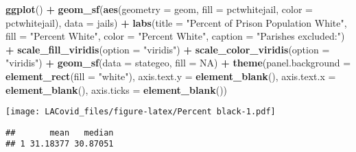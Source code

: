 \documentclass[
]{article}
\newenvironment{Shaded}{\begin{snugshade}}{\end{snugshade}}
\newcommand{\DataTypeTok}[1]{\textcolor[rgb]{0.13,0.29,0.53}{#1}}
\newcommand{\KeywordTok}[1]{\textcolor[rgb]{0.13,0.29,0.53}{\textbf{#1}}}
\newcommand{\NormalTok}[1]{#1}
\newcommand{\OperatorTok}[1]{\textcolor[rgb]{0.81,0.36,0.00}{\textbf{#1}}}
\newcommand{\OtherTok}[1]{\textcolor[rgb]{0.56,0.35,0.01}{#1}}
\newcommand{\StringTok}[1]{\textcolor[rgb]{0.31,0.60,0.02}{#1}}
\begin{document}
\begin{Shaded}
\begin{Highlighting}[]
\KeywordTok{ggplot}\NormalTok{() }\OperatorTok{+}
\StringTok{  }\KeywordTok{geom_sf}\NormalTok{(}\KeywordTok{aes}\NormalTok{(}\DataTypeTok{geometry =}\NormalTok{ geom, }\DataTypeTok{fill =}\NormalTok{ pctwhitejail, }\DataTypeTok{color =}\NormalTok{ pctwhitejail), }\DataTypeTok{data =}\NormalTok{ jails) }\OperatorTok{+}
\StringTok{  }\KeywordTok{labs}\NormalTok{(}\DataTypeTok{title =} \StringTok{"Percent of Prison Population White"}\NormalTok{,}
       \DataTypeTok{fill =} \StringTok{"Percent White"}\NormalTok{,}
       \DataTypeTok{color =} \StringTok{"Percent White"}\NormalTok{,}
       \DataTypeTok{caption =} \StringTok{"Parishes excluded:"}\NormalTok{) }\OperatorTok{+}\StringTok{ }
\StringTok{  }\KeywordTok{scale_fill_viridis}\NormalTok{(}\DataTypeTok{option =} \StringTok{"viridis"}\NormalTok{) }\OperatorTok{+}\StringTok{ }
\StringTok{  }\KeywordTok{scale_color_viridis}\NormalTok{(}\DataTypeTok{option =} \StringTok{"viridis"}\NormalTok{) }\OperatorTok{+}
\StringTok{  }\KeywordTok{geom_sf}\NormalTok{(}\DataTypeTok{data =}\NormalTok{ stategeo, }\DataTypeTok{fill =} \OtherTok{NA}\NormalTok{) }\OperatorTok{+}
\StringTok{  }\KeywordTok{theme}\NormalTok{(}\DataTypeTok{panel.background =} \KeywordTok{element_rect}\NormalTok{(}\DataTypeTok{fill =} \StringTok{"white"}\NormalTok{),}
        \DataTypeTok{axis.text.y =} \KeywordTok{element_blank}\NormalTok{(),}
        \DataTypeTok{axis.text.x =} \KeywordTok{element_blank}\NormalTok{(),}
        \DataTypeTok{axis.ticks =} \KeywordTok{element_blank}\NormalTok{()) }
\end{Highlighting}
\end{Shaded}

\texttt{[image: LACovid\_files/figure-latex/Percent black-1.pdf]}

\begin{Shaded}
\end{Shaded}

\begin{verbatim}
##       mean   median
## 1 31.18377 30.87051
\end{verbatim}
\end{document}
